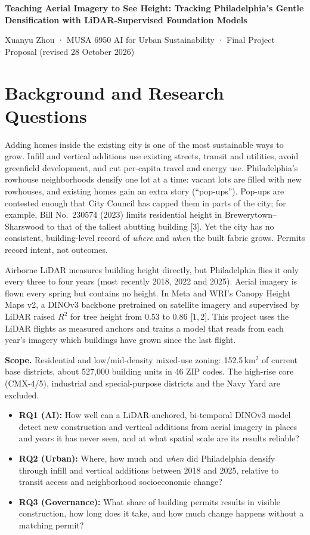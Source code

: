 \documentclass{article}
\begin{document}
\fontsize{10.5pt}{12.4pt}\selectfont

{\centering
{\Large\bfseries Teaching Aerial Imagery to See Height: Tracking Philadelphia's Gentle Densification with LiDAR-Supervised Foundation Models\par}
\vspace{3pt}
Xuanyu Zhou · MUSA 6950 AI for Urban Sustainability · Final Project Proposal (revised 28 October 2026)\par}

\section{Background and Research Questions}
Adding homes inside the existing city is one of the most sustainable ways to grow. Infill and vertical additions use existing streets, transit and utilities, avoid greenfield development, and cut per-capita travel and energy use. Philadelphia's rowhouse neighborhoods densify one lot at a time: vacant lots are filled with new rowhouses, and existing homes gain an extra story (``pop-ups''). Pop-ups are contested enough that City Council has capped them in parts of the city; for example, Bill No.~230574 (2023) limits residential height in Brewerytown--Sharswood to that of the tallest abutting building [3]. Yet the city has no consistent, building-level record of \emph{where} and \emph{when} the built fabric grows. Permits record intent, not outcomes.

Airborne LiDAR measures building height directly, but Philadelphia flies it only every three to four years (most recently 2018, 2022 and 2025). Aerial imagery is flown every spring but contains no height. In Meta and WRI's Canopy Height Maps v2, a DINOv3 backbone pretrained on satellite imagery and supervised by LiDAR raised $R^2$ for tree height from 0.53 to 0.86 [1,\,2]. This project uses the LiDAR flights as measured anchors and trains a model that reads from each year's imagery which buildings have grown since the last flight.

\textbf{Scope.} Residential and low/mid-density mixed-use zoning: 152.5\,km$^2$ of current base districts, about 527,000 building units in 46 ZIP codes. The high-rise core (CMX-4/5), industrial and special-purpose districts and the Navy Yard are excluded.
\begin{itemize}
\item \textbf{RQ1 (AI):} How well can a LiDAR-anchored, bi-temporal DINOv3 model detect new construction and vertical additions from aerial imagery in places and years it has never seen, and at what spatial scale are its results reliable?
\item \textbf{RQ2 (Urban):} Where, how much and \emph{when} did Philadelphia densify through infill and vertical additions between 2018 and 2025, relative to transit access and neighborhood socioeconomic change?
\item \textbf{RQ3 (Governance):} What share of building permits results in visible construction, how long does it take, and how much change happens without a matching permit?
\end{itemize}
\end{document}

